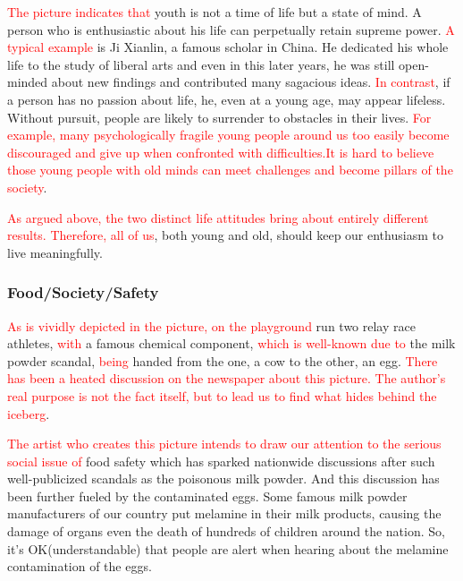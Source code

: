 \documentclass{article}
\begin{document}
\par \textcolor{red}{The picture indicates that} youth is not a time of life but a state
of mind. A person who is enthusiastic about his life can perpetually retain supreme
power. \textcolor{red}{A typical example} is Ji Xianlin, a famous scholar in China. He
dedicated his whole life to the study of liberal arts and even in this later years, he was
still open-minded about new findings and contributed many sagacious
ideas. \textcolor{red}{In contrast}, if a person has no passion about life, he, even at a
young age, may appear lifeless. Without pursuit, people are likely to surrender to
obstacles in their lives. \textcolor{red}{For example, many psychologically fragile young
  people around us too easily become discouraged and give up when confronted with
  difficulties.It is hard to believe those young people with old minds can meet challenges
  and become pillars of the society}.

\par \textcolor{red}{As argued above, the two distinct life attitudes bring about entirely
  different results. Therefore, all of us}, both young and old, should keep our enthusiasm
to live meaningfully.


\subsubsection{Food/Society/Safety}
\label{sec:foodsocietysafety}

\hspace{0.4cm} \textcolor{red}{As is vividly depicted in the picture, on the playground}
run two relay race athletes, \textcolor{red}{with} a famous chemical component,
\textcolor{red}{which is well-known due to} the milk powder scandal,
\textcolor{red}{being} handed from the one, a cow to the other, an
egg. \textcolor{red}{There has been a heated discussion on the newspaper about this
  picture. The author's real purpose is not the fact itself, but to lead us to find what
  hides behind the iceberg}.

\par \textcolor{red}{The artist who creates this picture intends to draw our attention to
  the serious social issue of} food safety which has sparked nationwide discussions after
such well-publicized scandals as the poisonous milk powder. And this discussion has been
further fueled by the contaminated eggs. Some famous milk powder manufacturers of our
country put melamine in their milk products, causing the damage of organs even the death
of hundreds of children around the nation. So, it's OK(understandable) that people are
alert when hearing about the melamine contamination of the eggs.
\end{document}
